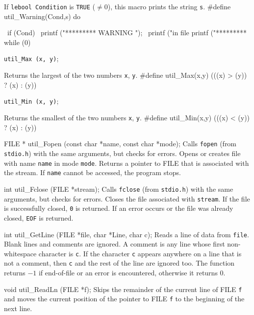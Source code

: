  \tab  If {\tt lebool Condition} is {\tt TRUE} ($\not = 0$),
 this macro prints the string {\tt s}.
 \endtab
\code
\hide
#define util_Warning(Cond,s) do { \
   if (Cond) { \
      printf ("*********  WARNING "); \
      printf ("in file  %
      printf ("*********  %
   } while (0)
\endhide
\endcode

\noindent 
{\tt util\_Max (x, y)};

 \tab  Returns the largest of the two numbers {\tt  x}, {\tt y}.
 \endtab
\code
\hide
#define util_Max(x,y) (((x) > (y)) ? (x) : (y))
\endhide
\endcode

\noindent 
{\tt util\_Min (x, y)};

 \tab  Returns the smallest of the two numbers {\tt  x}, {\tt y}.
 \endtab
\code
\hide
#define util_Min(x,y) (((x) < (y)) ? (x) : (y))
\endhide
\endcode



\code

FILE * util_Fopen (const char *name, const char *mode);
\endcode
  \tab 
  Calls {\tt fopen} (from {\tt stdio.h}) with the same arguments, but checks for errors.
  Opens or creates file with name {\tt name} in mode {\tt mode}. Returns a pointer to 
  FILE that is associated with the stream. If {\tt name} cannot be accessed, the program
  stops. 
 \endtab
\code

int util_Fclose (FILE *stream);
\endcode
  \tab 
   Calls {\tt fclose} (from {\tt stdio.h}) with the same arguments, but checks for errors.
   Closes the file associated with {\tt stream}. If the file is successfully 
   closed, {\tt 0}
   is returned. If an error occurs or the file was already closed, {\tt EOF} is returned.
 \endtab
\code

int util_GetLine (FILE *file, char *Line, char c);
\endcode
  \tab
  Reads a line of data from {\tt file}. Blank lines and comments are
  ignored. A comment is any line whose first non-whitespace character
  is {\tt c}. If the character {\tt c} appears anywhere on a line that is
  not a comment, then  {\tt c} and the rest of the line are ignored too. 
  The function returns $-1$ if end-of-file or an error is encountered,
  otherwise it returns 0.
  \endtab
\code

void util_ReadLn (FILE *f);
\endcode
  \tab
  Skips the remainder of the current line of FILE \texttt{f} and moves the current position
  of the pointer to FILE \texttt{f} to the beginning of the next line.
  \endtab
\code

}
